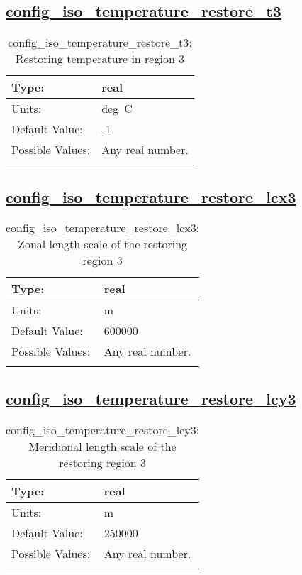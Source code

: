 \subsection[config\_iso\_temperature\_restore\_t3]{\hyperref[sec:nm_tab_iso]{config\_iso\_temperature\_restore\_t3}}
\label{subsec:nm_sec_config_iso_temperature_restore_t3}
\begin{center}
\begin{longtable}{| p{2.0in} || p{4.0in} |}
    \hline
    Type: & real \\
    \hline
    Units: & \si{deg.C} \\
    \hline
    Default Value: & -1 \\
    \hline
    Possible Values: & Any real number. \\
    \hline
    \caption{config\_iso\_temperature\_restore\_t3: Restoring temperature in region 3}
\end{longtable}
\end{center}
\subsection[config\_iso\_temperature\_restore\_lcx3]{\hyperref[sec:nm_tab_iso]{config\_iso\_temperature\_restore\_lcx3}}
\label{subsec:nm_sec_config_iso_temperature_restore_lcx3}
\begin{center}
\begin{longtable}{| p{2.0in} || p{4.0in} |}
    \hline
    Type: & real \\
    \hline
    Units: & \si{m} \\
    \hline
    Default Value: & 600000 \\
    \hline
    Possible Values: & Any real number. \\
    \hline
    \caption{config\_iso\_temperature\_restore\_lcx3: Zonal length scale of the restoring region 3}
\end{longtable}
\end{center}
\subsection[config\_iso\_temperature\_restore\_lcy3]{\hyperref[sec:nm_tab_iso]{config\_iso\_temperature\_restore\_lcy3}}
\label{subsec:nm_sec_config_iso_temperature_restore_lcy3}
\begin{center}
\begin{longtable}{| p{2.0in} || p{4.0in} |}
    \hline
    Type: & real \\
    \hline
    Units: & \si{m} \\
    \hline
    Default Value: & 250000 \\
    \hline
    Possible Values: & Any real number. \\
    \hline
    \caption{config\_iso\_temperature\_restore\_lcy3: Meridional length scale of the restoring region 3}
\end{longtable}
\end{center}

